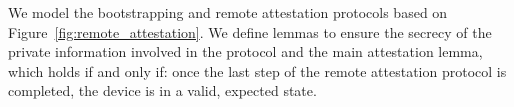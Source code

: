 \begingroup
\setlength{\belowdisplayskip}{-1.2em} 

We model the bootstrapping and remote attestation protocols based on Figure~\ref{fig:remote_attestation}. We define lemmas to ensure the secrecy of the private information involved in the protocol and the main attestation lemma, which holds if and only if: once the last step of the remote attestation protocol is completed, the \projecttitle{} device is in a valid, expected state. 
\fi
{}


